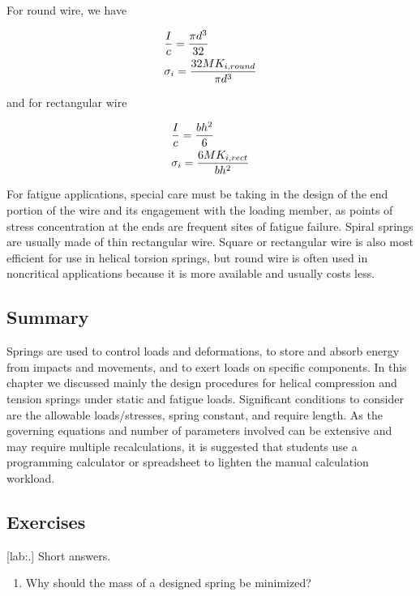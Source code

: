\documentclass[a4paper,openany,nobib]{tufte-book}
\begin{document}
{{For round wire, we have

$$\begin{gathered}
    \frac{I}{c} = \frac{\pi d^3}{32} \hfill \\
    \sigma_i = \frac{32MK_{i,round}}{\pi d^3} \hfill \\ 
  \end{gathered}$$

and for rectangular wire

$$\begin{gathered}
    \frac{I}{c} = \frac{bh^2}{6} \hfill \\
    \sigma_i = \frac{6MK_{i,rect}}{bh^2} \hfill \\ 
  \end{gathered}$$

For fatigue applications, special care must be taking in the design of
the end portion of the wire and its engagement with the loading member,
as points of stress concentration at the ends are frequent sites of
fatigue failure. Spiral springs are usually made of thin rectangular
wire. Square or rectangular wire is also most efficient for use in
helical torsion springs, but round wire is often used in noncritical
applications because it is more available and usually costs less.

\subsection{Summary}
\label{summary-5}
Springs are used to control loads and deformations, to store and absorb
energy from impacts and movements, and to exert loads on specific
components. In this chapter we discussed mainly the design procedures
for helical compression and tension springs under static and fatigue
loads. Significant conditions to consider are the allowable
loads/stresses, spring constant, and require length. As the governing
equations and number of parameters involved can be extensive and may
require multiple recalculations, it is suggested that students use a
programming calculator or spreadsheet to lighten the manual calculation
workload.

\subsection{Exercises}
\label{exercises-5}
[lab:.] Short answers.

\begin{enumerate}
\item Why should the mass of a designed spring be minimized?


\end{enumerate}}}
\end{document}
